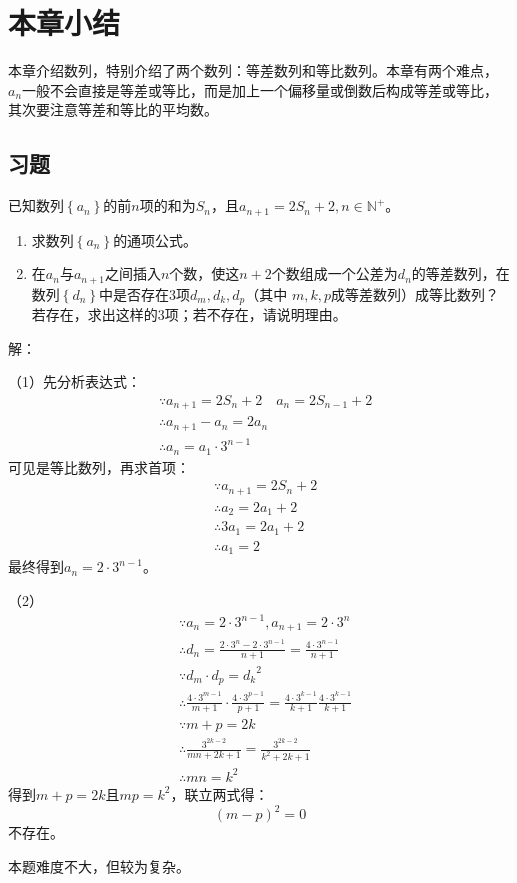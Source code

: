 \section{本章小结}

本章介绍数列，特别介绍了两个数列：等差数列和等比数列。本章有两个难点，$a_n$一般不会直接是等差或等比，而是加上一个偏移量或倒数后构成等差或等比，其次要注意等差和等比的平均数。

\subsection{习题}

\begin{example}
已知数列$\left\{ a_n \right\} $的前$n$项的和为$S_n$，且$a_{n+1}=2S_n+2,n\in \mathbb{N} ^+$。
\begin{enumerate}
    \item 求数列$\left\{ a_n \right\} $的通项公式。
    \item 在$a_n$与$a_{n+1}$之间插入$n$个数，使这$n+2$个数组成一个公差为$d_n$的等差数列，在数列$\left\{ d_n \right\} $中是否存在3项$d_m,d_k,d_p$（其中	$m,k,p$成等差数列）成等比数列？若存在，求出这样的3项；若不存在，请说明理由。
\end{enumerate}
\end{example}

解：

（1）先分析表达式：
\begin{align*}
&\because a_{n+1}=2S_n+2 \quad a_n=2S_{n-1}+2 \\
&\therefore a_{n+1}-a_n=2a_n \\
&\therefore a_n=a_1\cdot 3^{n-1}
\end{align*}
可见是等比数列，再求首项：
\begin{align*}
&\because a_{n+1}=2S_n+2 \\
&\therefore a_2=2a_1+2 \\
&\therefore 3a_1=2a_1+2 \\
&\therefore a_1=2
\end{align*}
最终得到$a_n=2\cdot 3^{n-1}$。

（2）
\begin{align*}
&\because a_n=2\cdot 3^{n-1},a_{n+1}=2\cdot 3^n \\
&\therefore d_n=\frac{2\cdot 3^n-2\cdot 3^{n-1}}{n+1}=\frac{4\cdot 3^{n-1}}{n+1} \\
&\because d_m\cdot d_p={d_k}^2 \\
&\therefore \frac{4\cdot 3^{m-1}}{m+1}\cdot \frac{4\cdot 3^{p-1}}{p+1}=\frac{4\cdot 3^{k-1}}{k+1}\frac{4\cdot 3^{k-1}}{k+1} \\
&\because m+p=2k \\
&\therefore \frac{3^{2k-2}}{mn+2k+1}=\frac{3^{2k-2}}{k^2+2k+1} \\
&\therefore mn=k^2
\end{align*}
得到$m+p=2k$且$mp=k^2$，联立两式得：
\[
\left( m-p \right) ^2=0
\]
不存在。

\begin{tcolorbox}
本题难度不大，但较为复杂。
\end{tcolorbox}




